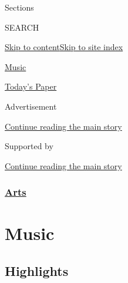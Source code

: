 Sections

SEARCH

\protect\hyperlink{site-content}{Skip to
content}\protect\hyperlink{site-index}{Skip to site index}

\href{https://www.nytimes3xbfgragh.onion/section/arts/music}{Music}

\href{https://myaccount.nytimes3xbfgragh.onion/auth/login?response_type=cookie\&client_id=vi}{}

\href{https://www.nytimes3xbfgragh.onion/section/todayspaper}{Today's
Paper}

Advertisement

\protect\hyperlink{after-top}{Continue reading the main story}

Supported by

\protect\hyperlink{after-sponsor}{Continue reading the main story}

\hypertarget{arts}{%
\subsubsection{\texorpdfstring{\href{/section/arts}{Arts}}{Arts}}\label{arts}}

\hypertarget{music}{%
\section{Music}\label{music}}

\hypertarget{highlights}{%
\subsection{Highlights}\label{highlights}}

